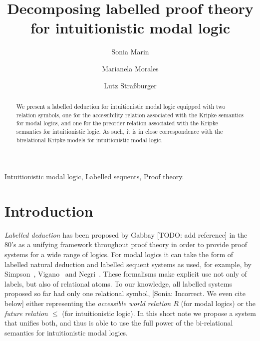 \documentclass[twoside]{aiml18}
\newcommand{\sonia}[1]{{\color{blue}[Sonia: #1]}}
\newcommand{\todo}[1]{{\color{red}[TODO: #1]}}
\begin{document}
\begin{frontmatter}
  \title{Decomposing labelled proof theory for intuitionistic modal logic}
  \author{Sonia Marin}
  \address{IT-Universitetet i K{\o}benhavn \\ Denmark }
 \author{Marianela Morales}
 \address{Universidad Nacional de C\'ordoba \\ Argentina}
   \author{Lutz Stra{\ss}burger}
 \address{Inria Saclay \& LIX, \'Ecole Polytechnique \\ France}

 \begin{abstract}
   We present a labelled deduction for intuitionistic modal logic equipped 
   with two relation symbols, one for the accessibility
   relation associated with the Kripke semantics for modal logics, and
   one for the preorder relation associated with the Kripke semantics
   for intuitionistic logic. 
   As such, it is in close
   correspondence with the birelational Kripke models for intuitionistic modal logic.


  \end{abstract}

  \begin{keyword}
  Intuitionistic modal logic, Labelled sequents, Proof theory.
  \end{keyword}
 \end{frontmatter}


\section{Introduction}

\emph{Labelled deduction} has been proposed by Gabbay 
\todo{add reference}
in the 80’s as a unifying framework throughout proof theory in order to provide proof
systems for a wide range of logics. 
%
For modal logics it can take
the form of labelled natural deduction and labelled sequent systems as
used, for example, by Simpson~\cite{Simpson}, Vigano~\cite{Vigano} and
Negri~\cite{Negri}. 
%
These formalisms make explicit use not only of
labels, but also of relational atoms. 
%
To our knowledge, all labelled
systems proposed so far had only one relational symbol, 
\sonia{Incorrect. We even cite~\cite{Maffezioli} below}
either representing the \emph{accessible world relation $R$} (for modal
logics) or the \emph{future relation $\le$} (for intuitionistic
logic). 
%
In this short note we propose a system that unifies both, and
thus is able to use the full power of the bi-relational semantics for
intuitionistic modal logics.
\end{document}
